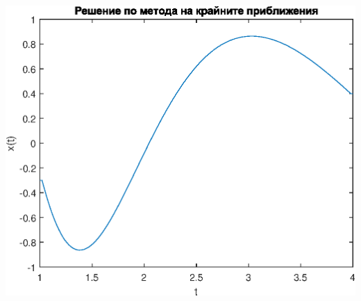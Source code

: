 \documentclass[a4paper,fleqn,12pt]{article}
\begin{document}
\includegraphics{thirdTask_01.eps}

\newpage
\end{document}
